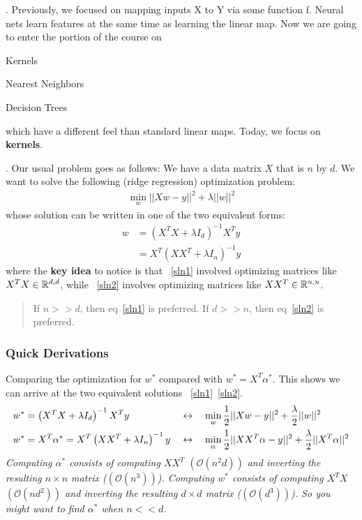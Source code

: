 \documentclass[12pt]{article}
\newcommand{\myspace}{\vspace{2\bigskipamount}}
\newcommand\p{\Needspace{10\baselineskip} \noindent}
\begin{document}

\p {}. Previously, we focused on mapping inputs X to Y via some function f. Neural nets learn features at the same time as learning the linear map. Now we are going to enter the portion of the course on
\begin{compactitem}[$\rightarrow$]
	\item Kernels
	\item Nearest Neighbors
	\item Decision Trees
\end{compactitem}
which have a different feel than standard linear maps. Today, we focus on \textbf{kernels}. 

\myspace
\p {}. Our usual problem goes as follows: We have a data matrix $X$ that is $n$ by $d$. We want to solve the following (ridge regression) optimization problem:
\begin{align}
\min_{w} ||Xw - y||^2 + \lambda ||w||^2 
\end{align}
whose solution can be written in one of the two equivalent forms:
\begin{align}
w &=  \left( X^T X + \lambda I_d\right)^{-1} X^T y \label{sln1}\\
 &=  X^T \left( X X^T + \lambda I_n\right)^{-1} y \label{sln2}
\end{align}
where the \textbf{key idea} to notice is that ~\ref{sln1} involved optimizing matrices like $X^T X \in \mathbb{R}^{d,d}$, while ~\ref{sln2} involves optimizing matrices like $X X^T \in \mathbb{R}^{n,n}$. 
\begin{quote}
	If $n >> d$, then eq~\ref{sln1} is preferred. If $d >> n$, then eq~\ref{sln2} is preferred.
\end{quote}

\subsubsection*{Quick Derivations}

\p Comparing the optimization for $w^*$ compared with $w^* = X^T \alpha^*$. This shows we can arrive at the two equivalent solutions ~\ref{sln1}~\ref{sln2}. 
\begin{alignat}{2}
w^* &= \left( X^T X + \lambda I_d\right)^{-1} X^T y \quad 
	&&\leftrightarrow \quad \min_{w} \frac{1}{2}||Xw - y||^2 + \frac{\lambda}{2} ||w||^2  \\
w^* &= X^T \alpha^* = X^T \left( X X^T + \lambda I_n\right)^{-1} y
	&&\leftrightarrow \quad \min_{\alpha} \frac{1}{2}||XX^T \alpha - y||^2 + \frac{\lambda}{2} ||X^T \alpha||^2
\end{alignat}
\textit{Computing $\alpha^*$ consists of computing $XX^T$ $(\mathcal{O}(n^2d))$ and inverting the resulting $n \times n$
	matrix ($(\mathcal{O}(n^3))$). Computing $w^*$ consists of computing $X^TX$ $(\mathcal{O}(nd^2))$ and inverting the
	resulting $d \times d$ matrix ($(\mathcal{O}(d^3))$). So you might want to find $\alpha^*$ when $n << d$.}\\
\end{document}
